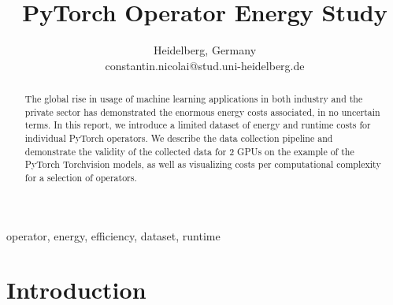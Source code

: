 \documentclass[conference]{IEEEtran}
\begin{document}
\title{PyTorch Operator Energy Study}

\author{
Heidelberg, Germany \\
constantin.nicolai@stud.uni-heidelberg.de}


\maketitle

\begin{abstract}
The global rise in usage of machine learning applications in both industry and the private sector has demonstrated the enormous energy costs associated, in no uncertain terms. In this report, we introduce a limited dataset of energy and runtime costs for individual PyTorch operators. We describe the data collection pipeline and demonstrate the validity of the collected data for 2 GPUs on the example of the PyTorch Torchvision models, as well as visualizing costs per computational complexity for a selection of operators.
\end{abstract}

\begin{IEEEkeywords}
operator, energy, efficiency, dataset, runtime
\end{IEEEkeywords}

\section{Introduction}
\end{document}
